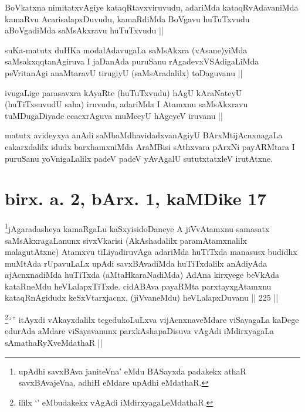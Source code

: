 \begin{artha}
BoVkatxna nimitatxvAgiye kataqRtavxviruvudu, adariMda kataqRvAdavaniMda kamaRvu AcarisalapxDuvudu, kamaRdiMda BoVgavu huTuTxvudu aBoVgadiMda saMsAkxravu huTuTxvudu ||
\end{artha}


\begin{artha}
suKa-matutx duHKa modalAdavugaLa saMsAkxra (vAsane)yiMda saMsakxqqtanAgiruva I jaDanAda puruSanu rAgadevxVSAdigaLiMda peVritanAgi anaMtaravU tirugiyU (saMsAradalilx) toDaguvanu ||
\end{artha}

\begin{artha}
ivugaLige parasavxra kAyaRte (huTuTxvudu) hAgU kAraNateyU (huTiTxsuvudU saha) iruvudu, adariMda I Atamxnu saMsAkxravu tuMDugaDiyade ecacxrAguva muMceyU hAgeyeV iruvanu ||
\end{artha}

\begin{artha}
matutx avideyxya anAdi saMbaMdhavidadxvanAgiyU BArxMtijAcnxnagaLa cakarxdalilx idudx barxhamxniMda AraMBisi sAthxvara pArxNi payARMtara I puruSanu yoVnigaLalilx padeV padeV yAvAgalU sututxtatxleV irutAtxne.
\end{artha}

\section*{birx. a. 2, bArx. 1, kaMDike 17}


\begin{artha}
\footnote{upAdhi savxBAva janiteVna' eMdu BASayxda padakekx athaR savxBAvajeVna, adhiH eMdare upAdhi eMdathaR.}jAgaradasheya kamaRgaLu kaSxyisidoDaneye A jiVvAtamxnu samasatx saMsAkxragaLanunx sivxVkarisi (AkAshadalilx paramAtamxnalilx malagutAtxne) Atamxvu tiLiyadiruvAga adariMda huTiTxda manasusx budidhx muMtAda rUpavuLaLx upAdi savxBAvadiMda huTiTxdalilx anAdiyAda ajAcnxnadiMda huTiTxda (aMtaHkaraNadiMda) AdAna kirxyege beVkAda kataRneMdu heVLalapxTiTxde. cidABAva payaRMta parxtayxgAtamxnu kataqRnAgidudx keSxVtarxjacnx, (jiVvaneMdu) heVLalapxDuvanu || 225 || 
\end{artha}

\begin{artha}
\footnote{ililx `\stext' eMbudakekx vAgAdi iMdirxyagaLeMdathaR.}``\stext'' itAyxdi vAkayxdalilx tegedukoLuLxva vijAcnxnaveMdare viSayagaLa kaDege edurAda aMdare viSayavanunx parxkAshapaDisuva vAgAdi iMdirxyagaLa sAmathaRyXveMdathaR ||
\end{artha}

